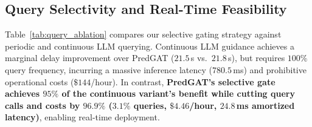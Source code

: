 \documentclass[11pt,a4paper,twocolumn]{article}
\begin{document}
\begin{table}[t]
\centering
\small
\caption{\textbf{Query Strategy Ablation.} Comparing Continuous vs.\ Selective LLM Guidance with Qwen-2.5-32B.}
\label{tab:query_ablation}
\end{table}

\subsection{Query Selectivity and Real-Time Feasibility}
Table~\ref{tab:query_ablation} compares our selective gating strategy against periodic and continuous LLM querying.
Continuous LLM guidance achieves a marginal delay improvement over PredGAT ($21.5$\,s vs.\ $21.8$\,s), but requires $100\%$ query frequency, incurring a massive inference latency ($780.5$\,ms) and prohibitive operational costs ($\$144$/hour). In contrast, \textbf{PredGAT's selective gate achieves $95\%$ of the continuous variant's benefit while cutting query calls and costs by $96.9\%$ ($3.1\%$ queries, $\$4.46$/hour, $24.8$\,ms amortized latency)}, enabling real-time deployment.
\end{document}
